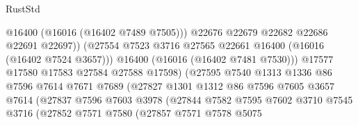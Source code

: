 \begin{lexlean}{RustStd}
\begin{coremodule}
                                          @16400
                                          (@16016 (@16402 @7489 @7505)))
                                        @22676
                                        @22679
                                        @22682
                                        @22686
                                        @22691
                                        @22697))
                                    (@27554
                                      @7523
                                      @3716
                                      @27565
                                      @22661
                                      @16400
                                      (@16016 (@16402 @7524 @3657)))
                                    @16400
                                    (@16016 (@16402 @7481 @7530)))
                                  @17577
                                  @17580
                                  @17583
                                  @27584
                                  @27588
                                  @17598)
                                (@27595
                                  @7540
                                  @1313
                                  @1336
                                  @86
                                  @7596
                                  @7614
                                  @7671
                                  @7689
                                  (@27827
                                    @1301
                                    @1312
                                    @86
                                    @7596
                                    @7605
                                    @3657
                                    @7614
                                    (@27837
                                      @7596
                                      @7603
                                      @3978
                                      (@27844
                                        @7582
                                        @7595
                                        @7602
                                        @3710
                                        @7545
                                        @3716
                                        (@27852
                                          @7571
                                          @7580
                                          (@27857
                                            @7571
                                            @7578
                                            @5075

\end{coremodule}
\end{lexlean}

